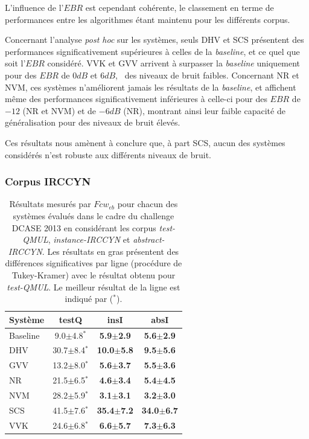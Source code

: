 
L'influence de l'$EBR$ est cependant cohérente, le classement en terme de performances entre les algorithmes étant maintenu pour les différents corpus.

Concernant l'analyse \emph{post hoc} sur les systèmes, seuls DHV et SCS présentent des performances significativement supérieures à celles de la \emph{baseline}, et ce quel que soit l'$EBR$ considéré. VVK et GVV arrivent à surpasser la \emph{baseline} uniquement pour des $EBR$ de $0dB$ et $6dB$, \ie~des niveaux de bruit faibles. Concernant NR et NVM, ces systèmes n'améliorent jamais les résultats de la \emph{baseline}, et affichent même des performances significativement inférieures à celle-ci pour des $EBR$ de $-12$ (NR et NVM) et de $-6dB$ (NR), montrant ainsi leur faible capacité de généralisation pour des niveaux de bruit élevés.

Ces résultats nous amènent à conclure que, à part SCS, aucun des systèmes considérés n'est robuste aux différents niveaux de bruit.

\subsubsection{Corpus IRCCYN}

\begin{table}
\begin{center} 
\begin{tabular}{lccc}
Système  & testQ            & insI                   & absI \\ 
\hline 
Baseline & 9.0$\pm$4.8$^*$  &  \textbf{5.9$\pm$2.9}  &  \textbf{5.6$\pm$2.9} \\ 
DHV      & 30.7$\pm$8.4$^*$ &  \textbf{10.0$\pm$5.8} &  \textbf{9.5$\pm$5.6} \\ 
GVV      & 13.2$\pm$8.0$^*$ &  \textbf{5.6$\pm$3.7}  &  \textbf{5.5$\pm$3.6} \\
NR       & 21.5$\pm$6.5$^*$ &  \textbf{4.6$\pm$3.4}  &  \textbf{5.4$\pm$4.5} \\ 
NVM      & 28.2$\pm$5.9$^*$ &  \textbf{3.1$\pm$3.1}  &  \textbf{3.2$\pm$3.0} \\ 
SCS      & 41.5$\pm$7.6$^*$ &  \textbf{35.4$\pm$7.2} & \textbf{34.0$\pm$6.7} \\ 
VVK      & 24.6$\pm$6.8$^*$ &  \textbf{6.6$\pm$5.7}  &  \textbf{7.3$\pm$6.3} \\ 
\hline
\end{tabular} 
\end{center}  
\caption[Résultats mesurés par $Fcw_{eb}$ pour chacun des systèmes évalués dans le cadre du challenge DCASE 2013 en considérant les corpus \emph{test-QMUL}, \emph{instance-IRCCYN} et \emph{abstract-IRCCYN}.]{Résultats mesurés par $Fcw_{eb}$ pour chacun des systèmes évalués dans le cadre du challenge DCASE 2013 en considérant les corpus \emph{test-QMUL}, \emph{instance-IRCCYN} et \emph{abstract-IRCCYN}. Les résultats en gras présentent des différences significatives par ligne (procédure de Tukey-Kramer) avec le résultat obtenu pour \emph{test-QMUL}. Le meilleur résultat de la ligne est indiqué par ($^*$).}
\label{tab:irccyn} 
\end{table} 

